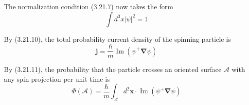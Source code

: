 \documentclass{article}
\begin{document}
The normalization condition (3.21.7) now takes the form
$$
\begin{equation*}
\int d^{3} x|\psi|^{2}=1 \tag{3.21.29}
\end{equation*}
$$

By (3.21.10), the total probability current density of the spinning particle is
$$
\begin{equation*}
\boldsymbol{j}=\frac{\hbar}{m} \operatorname{Im}\left(\psi^{+} \boldsymbol{\nabla} \psi\right) \tag{3.21.30}
\end{equation*}
$$

By (3.21.11), the probability that the particle crosses an oriented surface $\mathcal{A}$ with any spin projection per unit time is
$$
\begin{equation*}
\Phi(\mathcal{A})=\frac{\hbar}{m} \int_{\mathcal{A}} d^{2} \boldsymbol{x} \cdot \operatorname{Im}\left(\psi^{+} \boldsymbol{\nabla} \psi\right) \tag{3.21.31}
\end{equation*}
$$
\end{document}
